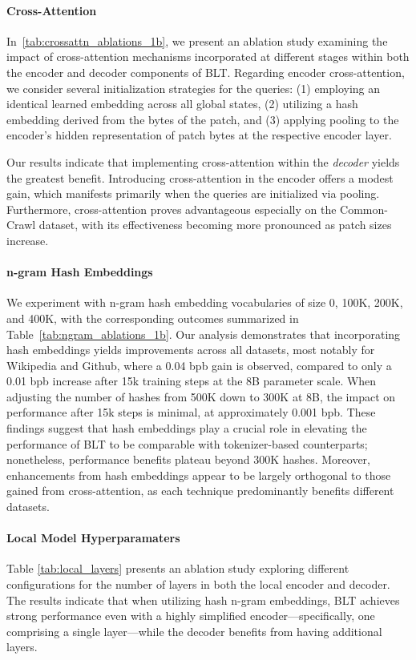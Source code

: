 \paragraph{Cross-Attention} 
In~\autoref{tab:crossattn_ablations_1b}, we present an ablation study examining the impact of cross-attention mechanisms incorporated at different stages within both the encoder and decoder components of {\textsc BLT}. Regarding encoder cross-attention, we consider several initialization strategies for the queries: (1) employing an identical learned embedding across all global states, (2) utilizing a hash embedding derived from the bytes of the patch, and (3) applying pooling to the encoder's hidden representation of patch bytes at the respective encoder layer.

Our results indicate that implementing cross-attention within the \textit{decoder} yields the greatest benefit. Introducing cross-attention in the encoder offers a modest gain, which manifests primarily when the queries are initialized via pooling. Furthermore, cross-attention proves advantageous especially on the Common-Crawl dataset, with its effectiveness becoming more pronounced as patch sizes increase.

\paragraph{n-gram Hash Embeddings} 

We experiment with n-gram hash embedding vocabularies of size 0, 100K, 200K, and 400K, with the corresponding outcomes summarized in Table~\ref{tab:ngram_ablations_1b}. Our analysis demonstrates that incorporating hash embeddings yields improvements across all datasets, most notably for Wikipedia and Github, where a 0.04 bpb gain is observed, compared to only a 0.01 bpb increase after 15k training steps at the 8B parameter scale. When adjusting the number of hashes from 500K down to 300K at 8B, the impact on performance after 15k steps is minimal, at approximately 0.001 bpb. These findings suggest that hash embeddings play a crucial role in elevating the performance of {\textsc BLT} to be comparable with tokenizer-based counterparts; nonetheless, performance benefits plateau beyond 300K hashes. Moreover, enhancements from hash embeddings appear to be largely orthogonal to those gained from cross-attention, as each technique predominantly benefits different datasets.

\paragraph{Local Model Hyperparamaters} Table \ref{tab:local_layers} presents an ablation study exploring different configurations for the number of layers in both the local encoder and decoder. The results indicate that when utilizing hash n-gram embeddings, {\textsc BLT} achieves strong performance even with a highly simplified encoder—specifically, one comprising a single layer—while the decoder benefits from having additional layers.

